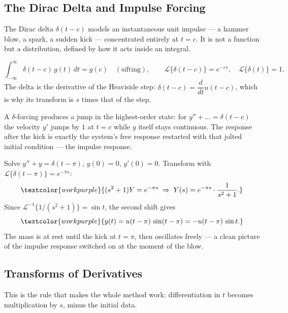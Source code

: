 \subsection{The Dirac Delta and Impulse Forcing}

The Dirac delta $\delta(t-c)$ models an instantaneous unit impulse --- a hammer blow,
a spark, a sudden kick --- concentrated entirely at $t=c$. It is not a function but a
distribution, defined by how it acts inside an integral.

\begin{formulabox}
\[ \int_{-\infty}^{\infty} \delta(t-c)\,g(t)\,dt = g(c) \quad(\text{sifting}), \qquad
   \mathcal{L}\{\delta(t-c)\} = e^{-cs}, \quad \mathcal{L}\{\delta(t)\}=1. \]
The delta is the derivative of the Heaviside step: $\delta(t-c) = \dfrac{d}{dt}u(t-c)$,
which is why its transform is $s$ times that of the step.
\end{formulabox}

\begin{conceptbox}
A $\delta$-forcing produces a \textcolor{accentorange}{jump in the highest-order
state}: for $y''+\dots = \delta(t-c)$ the velocity $y'$ jumps by $1$ at $t=c$ while
$y$ itself stays continuous. The response after the kick is exactly the system's
free response restarted with that jolted initial condition --- the
\textcolor{accentorange}{impulse response}.
\end{conceptbox}

\begin{examplebox}
Solve $y'' + y = \delta(t-\pi)$, $y(0)=0$, $y'(0)=0$. Transform with
$\mathcal{L}\{\delta(t-\pi)\}=e^{-\pi s}$:
\[ \textcolor{workpurple}{(s^2+1)Y = e^{-\pi s}
   \;\Rightarrow\; Y(s) = e^{-\pi s}\cdot\frac{1}{s^2+1}.} \]
Since $\mathcal{L}^{-1}\{1/(s^2+1)\}=\sin t$, the second shift gives
\[ \textcolor{workpurple}{y(t) = u(t-\pi)\,\sin(t-\pi) = -u(t-\pi)\,\sin t.} \]
The mass is at rest until the kick at $t=\pi$, then oscillates freely --- a clean
picture of the impulse response switched on at the moment of the blow.
\end{examplebox}

\subsection{Transforms of Derivatives}

This is the rule that makes the whole method work: differentiation in $t$ becomes
multiplication by $s$, minus the initial data.

